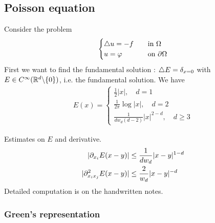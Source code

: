 \documentclass[12pt,a4paper]{article}
\newenvironment{proof}
{\begin{changemargin}{1cm}{0.5cm} 
	}%
	{\end{changemargin}
}
\begin{document}
\subsection*{Poisson equation}

Consider the problem
\begin{align*}
\begin{cases}
\triangle u = -f\quad &\text{in } \Omega\\
u = \varphi \quad &\text{on } \partial \Omega
\end{cases}
\end{align*}
First we want to find the fundamental solution : $\triangle E =\delta_{x=0}$ with $E\in C^{\infty} (\mathbb{R}^d \backslash \{0\})$, i.e. the fundamental solution. We have
\begin{align*}
E(x) = \begin{cases}
\frac{1}{2} |x|, \quad d=1\\
\frac{1}{2\pi} \log |x|, \quad d=2\\
\frac{1}{dw_d (d-2)}|x|^{2-d}, \quad d\geq 3
\end{cases}
\end{align*}

\begin{proof}
\pf Estimates on $E$ and derivative.
\begin{align*}
|\partial_{x_i} E(x-y) | &\leq \frac{1}{dw_d} |x-y|^{1-d}\\
|\partial_{x_i x_j}^2 E(x-y) |&\leq \frac{2}{w_d} |x-y|^{-d}
\end{align*}
Detailed computation is on the handwritten notes.
\end{proof}
\s

\subsubsection*{Green's representation}
\end{document}
